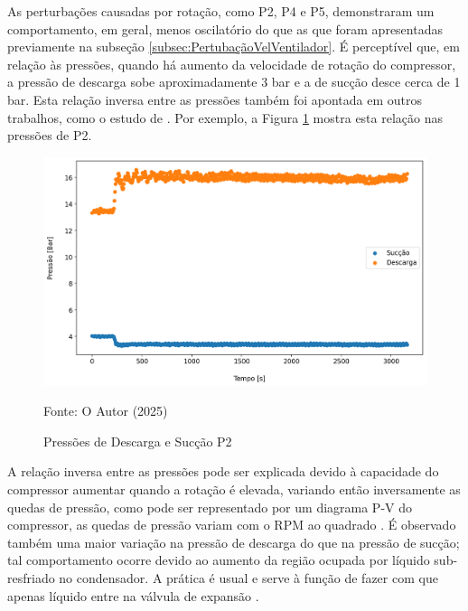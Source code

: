 As perturbações causadas por rotação, como P2, P4 e P5, demonstraram um comportamento, em geral, menos oscilatório do que as que foram apresentadas previamente na subseção \ref{subsec:PertubaçãoVelVentilador}. É perceptível que, em relação às pressões, quando há aumento da velocidade de rotação do compressor, a pressão de descarga sobe aproximadamente 3 bar e a de sucção desce cerca de 1 bar. Esta relação inversa entre as pressões também foi apontada em outros trabalhos, como o estudo de \textcite{EffectsOFRefrigeranteCompressorAirFlow}. Por exemplo, a Figura \ref{fig:Pressão de Descarga e Sucção P2} mostra esta relação nas pressões de P2. 

\begin{figure}[h]
    \centering
    \includegraphics[width=1\linewidth]{FigurasdoTexto/Pressão de Descarga e Sucção P2.png}
    \caption{Pressões de Descarga e Sucção P2}
    \label{fig:Pressão de Descarga e Sucção P2}
    {\footnotesize Fonte: O Autor (2025)}
\end{figure}

A relação inversa entre as pressões pode ser explicada devido à capacidade do compressor aumentar quando a rotação é elevada, variando então inversamente as quedas de pressão, como pode ser representado por um diagrama P-V do compressor, as quedas de pressão variam com o RPM ao quadrado \cite{phillippi2008basic}.
É observado também uma maior variação na pressão de descarga do que na pressão de sucção; tal comportamento ocorre devido ao aumento da região ocupada por líquido sub-resfriado no condensador. A prática é usual e serve à função de fazer com que apenas líquido entre na válvula de expansão \cite{StoekerRefrigeration}.

